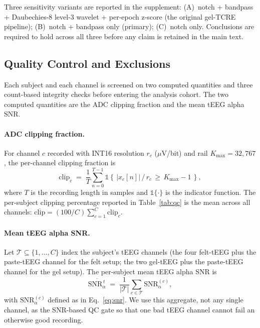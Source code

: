 \documentclass[10pt,a4paper]{article}
\providecommand{\upmu}{\ensuremath{\mu}}        %
\begin{document}
Three sensitivity variants are reported in the supplement: (A)~notch + bandpass + Daubechies-8 level-3 wavelet + per-epoch z-score (the original gel-TCRE pipeline); (B)~notch + bandpass only (primary); (C)~notch only. Conclusions are required to hold across all three before any claim is retained in the main text.


\subsection{Quality Control and Exclusions}\label{sec:qc}
Each subject and each channel is screened on two computed quantities and three count-based integrity checks before entering the analysis cohort. The two computed quantities are the
ADC clipping fraction and the mean tEEG alpha SNR.

\paragraph{ADC clipping fraction.} For channel $c$ recorded with INT16 resolution $r_{c}$ ($\upmu$V/bit) and rail $K_{\max}=32{,}767$, the per-channel clipping fraction is
\begin{equation}
\mathrm{clip}_{c}
\;=\;
\frac{1}{T}\sum_{n=0}^{T-1}\mathbb{1}\!\left\{\,\bigl|x_{c}[n]\bigr|\,/\,r_{c}\,\ge\,K_{\max}-1\,\right\},
\label{eq:clip}
\end{equation}
where $T$ is the recording length in samples and $\mathbb{1}\{\cdot\}$ is the indicator function. The per-subject clipping percentage reported in Table~\ref{tab:qc} is the mean
across all channels: $\overline{\mathrm{clip}} = (100/C)\sum_{c=1}^{C}\mathrm{clip}_{c}$.

\paragraph{Mean tEEG alpha SNR.} Let $\mathcal{T}\subseteq\{1,\ldots,C\}$ index the subject's tEEG channels (the four felt-tEEG plus the paste-tEEG channel for the felt setup; the
two gel-tEEG plus the paste-tEEG channel for the gel setup). The per-subject mean tEEG alpha SNR is
\begin{equation}
\overline{\mathrm{SNR}_{\alpha}^{\,t}}
\;=\;
\frac{1}{|\mathcal{T}|}\sum_{c\in\mathcal{T}}\mathrm{SNR}_{\alpha}^{(c)},
\label{eq:meansnrt}
\end{equation}
with $\mathrm{SNR}_{\alpha}^{(c)}$ defined as in Eq.~\eqref{eq:snr}. We use this aggregate, not any single channel, as the SNR-based QC gate so that one bad tEEG channel cannot fail
an otherwise good recording.
\end{document}

